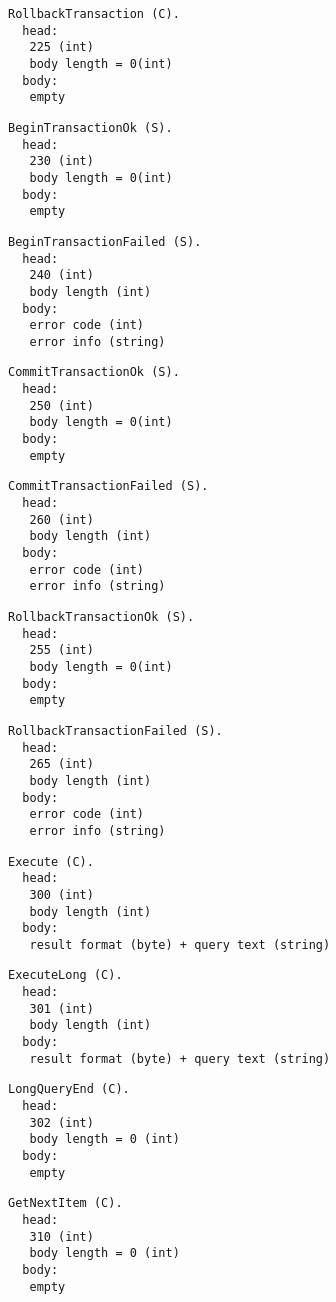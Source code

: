 \documentclass[a4paper,12pt]{article}
\begin{document}
\begin{verbatim}
RollbackTransaction (C).
  head:
   225 (int)
   body length = 0(int)
  body:
   empty
\end{verbatim}   

\begin{verbatim}
BeginTransactionOk (S).
  head:
   230 (int)
   body length = 0(int)
  body:
   empty
\end{verbatim}
   
\begin{verbatim}
BeginTransactionFailed (S).
  head:
   240 (int)
   body length (int)
  body:
   error code (int)
   error info (string)
\end{verbatim}

\begin{verbatim}
CommitTransactionOk (S).
  head:
   250 (int)
   body length = 0(int)
  body:
   empty
\end{verbatim}

\begin{verbatim}
CommitTransactionFailed (S).
  head:
   260 (int)
   body length (int)
  body:
   error code (int)
   error info (string)
\end{verbatim}

\begin{verbatim}
RollbackTransactionOk (S).
  head:
   255 (int)
   body length = 0(int)
  body:
   empty
\end{verbatim}

\begin{verbatim}
RollbackTransactionFailed (S).
  head:
   265 (int)
   body length (int)
  body:
   error code (int)
   error info (string)
\end{verbatim}

\begin{verbatim}
Execute (C).
  head:
   300 (int)
   body length (int)
  body:
   result format (byte) + query text (string)
\end{verbatim}

\begin{verbatim}
ExecuteLong (C).
  head:
   301 (int)
   body length (int)
  body:
   result format (byte) + query text (string)
\end{verbatim}

\begin{verbatim}
LongQueryEnd (C).
  head:
   302 (int)
   body length = 0 (int)
  body:
   empty
\end{verbatim}

\begin{verbatim}
GetNextItem (C).
  head:
   310 (int)
   body length = 0 (int)
  body:
   empty
\end{verbatim}
\end{document}
